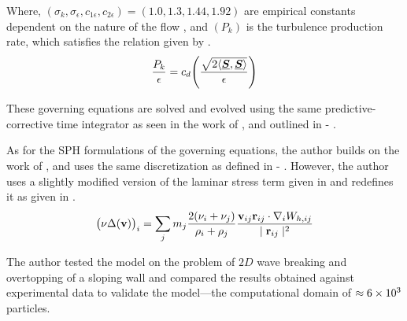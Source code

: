 Where, $(\sigma_k, \sigma_{\epsilon}, c_{1\epsilon}, c_{2\epsilon}) = (1.0, 1.3, 1.44, 1.92)$ are empirical constants dependent on the nature of the flow , and $(P_k)$ is the turbulence production rate, which satisfies the relation given by  \parencite{pope2000turbulent}.
\begin{equation}
    \frac{P_k}{\epsilon} = c_d \Bigg( \frac{\sqrt{2 \langle \underline{\bm{S}}, \underline{\bm{S}} \rangle}}{\epsilon} \Bigg)
    \label{eq:pope2000turbulent-k-production-relation}
\end{equation}

These governing equations are solved and evolved using the same predictive-corrective time integrator as seen in the work of \parencite{Gotoh2004}, and outlined in  - .

As for the SPH formulations of the governing equations, the author builds on the work of \parencite{Gotoh2004}, and uses the same discretization as defined in  - . However, the author uses a slightly modified version of the laminar stress term given in  and redefines it as given in .
\begin{equation}
    \big(\nu \Delta(\mathbf{v}) \big)_i = \sum_j m_j \frac{2 ( \nu_i + \nu_j ) }{ \rho_i + \rho_j }\frac{\mathbf{v}_{ij} \mathbf{r}_{ij} \cdot \nabla_{i} W_{h, ij}}{\mid \mathbf{r}_{ij} \mid^{2}}
    \label{eq:Shao2006-vel-laplacian-sph}
\end{equation}

The author tested the model on the problem of $2D$ wave breaking and overtopping of a sloping wall and compared the results obtained against experimental data \parencite{li2004wave} to validate the model—the computational domain of $\approx 6 \times {10}^{3}$ particles.

